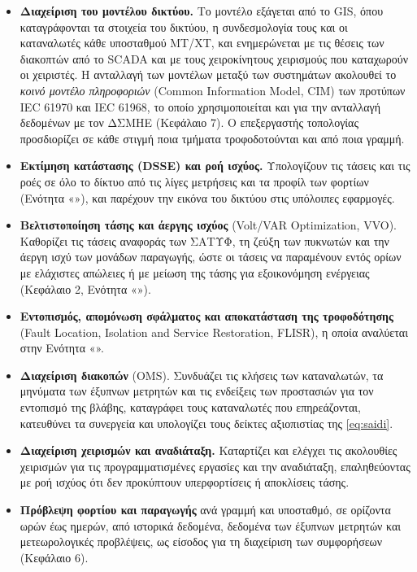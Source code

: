 \begin{itemize}
\item \textbf{Διαχείριση του μοντέλου δικτύου.} Το μοντέλο εξάγεται από το GIS, όπου
      καταγράφονται τα στοιχεία του δικτύου, η συνδεσμολογία τους και οι καταναλωτές κάθε
      υποσταθμού ΜΤ/ΧΤ, και ενημερώνεται με τις θέσεις των διακοπτών από το SCADA και με τους
      χειροκίνητους χειρισμούς που καταχωρούν οι χειριστές. Η ανταλλαγή των μοντέλων μεταξύ
      των συστημάτων ακολουθεί το \emph{κοινό μοντέλο πληροφοριών} (Common Information Model,
      CIM) των προτύπων IEC 61970 και IEC 61968, το οποίο χρησιμοποιείται και για την
      ανταλλαγή δεδομένων με τον ΔΣΜΗΕ (Κεφάλαιο 7). Ο επεξεργαστής τοπολογίας προσδιορίζει σε κάθε
      στιγμή ποια τμήματα τροφοδοτούνται και από ποια γραμμή.
\item \textbf{Εκτίμηση κατάστασης (DSSE) και ροή ισχύος.} Υπολογίζουν τις τάσεις και τις ροές σε όλο
      το δίκτυο από τις λίγες μετρήσεις και τα προφίλ των φορτίων (Ενότητα
      «»), και παρέχουν την εικόνα του δικτύου στις υπόλοιπες εφαρμογές.
\item \textbf{Βελτιστοποίηση τάσης και άεργης ισχύος} (Volt/VAR Optimization, VVO). Καθορίζει
      τις τάσεις αναφοράς των ΣΑΤΥΦ, τη ζεύξη των πυκνωτών και την άεργη ισχύ των μονάδων
      παραγωγής, ώστε οι τάσεις να παραμένουν εντός ορίων με ελάχιστες απώλειες ή με
      μείωση της τάσης για εξοικονόμηση ενέργειας (Κεφάλαιο 2, Ενότητα «»).
\item \textbf{Εντοπισμός, απομόνωση σφάλματος και αποκατάσταση της τροφοδότησης} (Fault
      Location, Isolation and Service Restoration, FLISR), η οποία αναλύεται στην Ενότητα
      «».
\item \textbf{Διαχείριση διακοπών} (OMS). Συνδυάζει τις κλήσεις των καταναλωτών, τα μηνύματα των
      έξυπνων μετρητών και τις ενδείξεις των προστασιών για τον εντοπισμό της βλάβης,
      καταγράφει τους καταναλωτές που επηρεάζονται, κατευθύνει τα συνεργεία και υπολογίζει
      τους δείκτες αξιοπιστίας της \eqref{eq:saidi}.
\item \textbf{Διαχείριση χειρισμών και αναδιάταξη.} Καταρτίζει και ελέγχει τις ακολουθίες
      χειρισμών για τις προγραμματισμένες εργασίες και την αναδιάταξη, επαληθεύοντας με ροή
      ισχύος ότι δεν προκύπτουν υπερφορτίσεις ή αποκλίσεις τάσης.
\item \textbf{Πρόβλεψη φορτίου και παραγωγής} ανά γραμμή και υποσταθμό, σε ορίζοντα ωρών έως
      ημερών, από ιστορικά δεδομένα, δεδομένα των έξυπνων μετρητών και μετεωρολογικές
      προβλέψεις, ως είσοδος για τη διαχείριση των συμφορήσεων
      (Κεφάλαιο 6).
\end{itemize}


